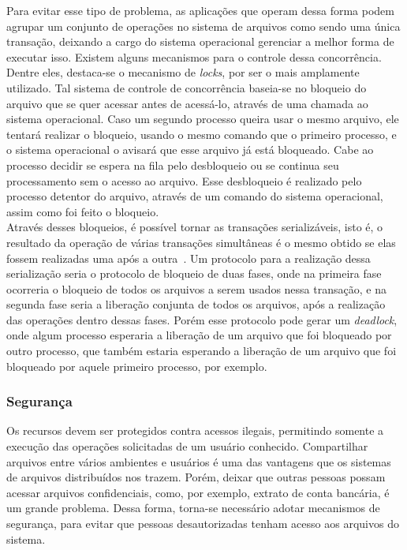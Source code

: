 	Para evitar esse tipo de problema, as aplicações que operam dessa forma podem agrupar um conjunto de operações no sistema de arquivos como sendo uma única transação, deixando a cargo do sistema operacional gerenciar a melhor forma de executar isso.
	Existem alguns mecanismos para o controle dessa concorrência. Dentre eles, destaca-se o mecanismo de \textit{locks}, por ser o mais amplamente utilizado. Tal sistema de controle de concorrência baseia-se no bloqueio do arquivo que se quer acessar antes de acessá-lo, através de uma chamada ao sistema operacional. Caso um segundo processo queira usar o mesmo arquivo, ele tentará realizar o bloqueio, usando o mesmo comando que o primeiro processo, e o sistema operacional o avisará que esse arquivo já está bloqueado. Cabe ao processo decidir se espera na fila pelo desbloqueio ou se continua seu processamento sem o acesso ao arquivo. Esse desbloqueio é realizado pelo processo detentor do arquivo, através de um comando do sistema operacional, assim
	como foi feito o bloqueio.\\
	
	Através desses bloqueios, é possível tornar as transações serializáveis, isto é, o resultado da operação de várias transações simultâneas é o mesmo obtido se elas fossem realizadas uma após a outra~\cite{kon94}. Um protocolo para a realização dessa serialização seria o protocolo de bloqueio de duas fases, onde na primeira fase ocorreria o bloqueio de todos os arquivos a serem usados nessa transação, e na segunda fase seria a liberação conjunta de todos os arquivos, após a realização das operações dentro dessas fases.
	Porém esse protocolo pode gerar um \textit{deadlock}, onde algum processo esperaria a liberação de um arquivo que foi bloqueado por outro processo, que também estaria esperando a liberação de um arquivo que foi bloqueado por aquele primeiro processo, por exemplo.
	
	\subsubsection{Segurança}
	Os recursos devem ser protegidos contra acessos ilegais, permitindo somente a execução das operações solicitadas de um usuário conhecido. 
	Compartilhar arquivos entre vários ambientes e usuários é uma das vantagens que os sistemas de arquivos distribuídos nos trazem. Porém, deixar que outras pessoas possam acessar arquivos confidenciais, como, por exemplo, extrato de conta bancária, é um grande problema. Dessa forma, torna-se necessário adotar mecanismos de segurança, para evitar que pessoas desautorizadas tenham acesso aos arquivos do sistema. \\
	
